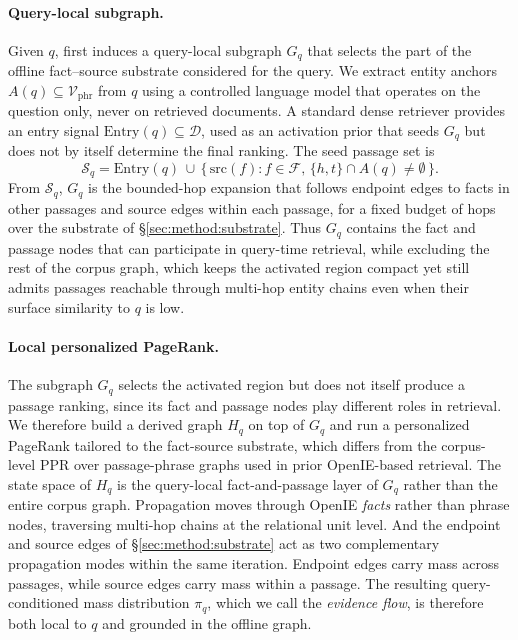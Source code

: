 \paragraph{Query-local subgraph.}
Given $q$, \methodname{} first induces a query-local subgraph $G_q$ that
selects the part of the offline fact--source substrate considered for
the query. We extract entity anchors
$A(q) \subseteq \mathcal{V}_{\mathrm{phr}}$ from $q$ using a controlled
language model that operates on the question only, never on retrieved
documents. A standard dense retriever provides an entry signal
$\mathrm{Entry}(q) \subseteq \mathcal{D}$, used as an activation prior
that seeds $G_q$ but does not by itself determine the final ranking.
The seed passage set is
\begin{equation}
\label{eq:gq-seed}
\mathcal{S}_q
=
\mathrm{Entry}(q) \,\cup\,
\{\,\mathrm{src}(f) : f\in\mathcal{F},\, \{h,t\}\cap A(q)\neq\emptyset\,\}.
\end{equation}
From $\mathcal{S}_q$, $G_q$ is the bounded-hop expansion that follows
endpoint edges to facts in other passages and source edges within
each passage, for a fixed budget of hops over the substrate of
\S\ref{sec:method:substrate}. Thus $G_q$ contains the fact and passage
nodes that can participate in query-time retrieval, while excluding
the rest of the corpus graph, which keeps the activated region compact
yet still admits passages reachable through multi-hop entity chains
even when their surface similarity to $q$ is low.

\paragraph{Local personalized PageRank.}
The subgraph $G_q$ selects the activated region but does not itself
produce a passage ranking, since its fact and passage nodes play
different roles in retrieval. We therefore build a derived graph
$H_q$ on top of $G_q$ and run a personalized PageRank tailored to
the fact-source substrate, which differs from the corpus-level PPR
over passage-phrase graphs used in prior OpenIE-based retrieval.
The state space of $H_q$ is the query-local fact-and-passage layer
of $G_q$ rather than the entire corpus graph. Propagation moves
through OpenIE \emph{facts} rather than phrase nodes, traversing
multi-hop chains at the relational unit level. And the endpoint and
source edges of \S\ref{sec:method:substrate} act as two complementary
propagation modes within the same iteration. Endpoint edges carry
mass across passages, while source edges carry mass within a passage.
The resulting query-conditioned mass distribution $\pi_q$, which we
call the \emph{evidence flow}, is therefore both local to $q$ and
grounded in the offline graph.

